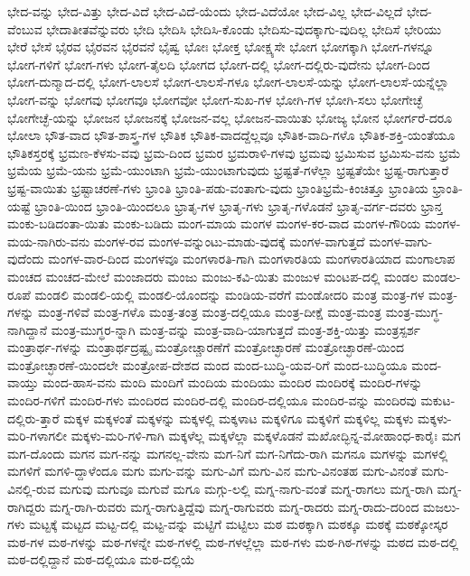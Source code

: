{ಭೇದ-ವನ್ನು
ಭೇದ-ವಿತ್ತು
ಭೇದ-ವಿದೆ
ಭೇದ-ವಿದೆ-ಯೆಂದು
ಭೇದ-ವಿದೆಯೋ
ಭೇದ-ವಿಲ್ಲ
ಭೇದ-ವಿಲ್ಲದೆ
ಭೇದ-ವೆಂಬುವ
ಭೇದಾತೀತವೆನ್ನುವರು
ಭೇದಿ
ಭೇದಿಸಿ
ಭೇದಿಸಿ-ಕೊಂಡು
ಭೇದಿಸು-ವುದಕ್ಕಾಗು-ವುದಿಲ್ಲ
ಭೇದಿಸೆ
ಭೇರಿಯು
ಭೇರೆ
ಭೇಸೆ
ಭೈರವ
ಭೈರವನ
ಭೈರವನೆ
ಭೈಷ್ವ
ಭೋಃ
ಭೋಕ್ತ
ಭೋಕ್ಷ್ಯಸೇ
ಭೋಗ
ಭೋಗಕ್ಕಾಗಿ
ಭೋಗ-ಗಳನ್ನೂ
ಭೋಗ-ಗಳಿಗೆ
ಭೋಗ-ಗಳು
ಭೋಗ-ತೈಲದಿ
ಭೋಗದ
ಭೋಗ-ದಲ್ಲಿ
ಭೋಗ-ದಲ್ಲಿರು-ವುದೇನು
ಭೋಗ-ದಿಂದ
ಭೋಗ-ದುನ್ಮಾದ-ದಲ್ಲಿ
ಭೋಗ-ಲಾಲಸೆ
ಭೋಗ-ಲಾಲಸೆ-ಗಳೂ
ಭೋಗ-ಲಾಲಸೆ-ಯನ್ನು
ಭೋಗ-ಲಾಲಸೆ-ಯನ್ನೆಲ್ಲಾ
ಭೋಗ-ವನ್ನು
ಭೋಗವು
ಭೋಗವೂ
ಭೋಗವೋ
ಭೋಗ-ಸುಖ-ಗಳ
ಭೋಗಿ-ಗಳ
ಭೋಗಿ-ಸಲು
ಭೋಗೇಚ್ಛೆ
ಭೋಗೇಚ್ಛೆ-ಯನ್ನು
ಭೋಜನ
ಭೋಜನಕ್ಕೆ
ಭೋಜನ-ವಲ್ಲ
ಭೋಜನ-ವಾಯಿತು
ಭೋಜ್ಯ
ಭೋನ
ಭೋರ್ಗರೆ-ದರೂ
ಭೋಲಾ
ಭೌತ-ವಾದ
ಭೌತ-ಶಾಸ್ತ್ರ-ಗಳ
ಭೌತಿಕ
ಭೌತಿಕ-ವಾದದ್ದೆಲ್ಲವೂ
ಭೌತಿಕ-ವಾದಿ-ಗಳೊ
ಭೌತಿಕ-ಶಕ್ತಿ-ಯಂತೆಯೂ
ಭೌತಿಕಸ್ತರಕ್ಕೆ
ಭ್ರಮಣ-ಕೆಳಸು-ವವು
ಭ್ರಮ-ದಿಂದ
ಭ್ರಮರ
ಭ್ರಮರಾಳಿ-ಗಳವು
ಭ್ರಮವು
ಭ್ರಮಿಸುವ
ಭ್ರಮಿಸು-ವನು
ಭ್ರಮೆ
ಭ್ರಮೆಯ
ಭ್ರಮೆ-ಯನು
ಭ್ರಮೆ-ಯುಂಟಾಗಿ
ಭ್ರಮೆ-ಯುಂಟಾಗುವುದು
ಭ್ರಷ್ಟತೆ-ಗಳೆಲ್ಲಾ
ಭ್ರಷ್ಟತೆಯೇ
ಭ್ರಷ್ಟ-ರಾಗುತ್ತಾರೆ
ಭ್ರಷ್ಟ-ವಾಯಿತು
ಭ್ರಷ್ಟಾಚರಣೆ-ಗಳು
ಭ್ರಾಂತಿ
ಭ್ರಾಂತಿ-ಪಡು-ವಂತಾಗು-ವುದು
ಭ್ರಾಂತಿಭ್ರಮೆ-ಕಿಂಚಿತ್ತೂ
ಭ್ರಾಂತಿಯ
ಭ್ರಾಂತಿ-ಯಷ್ಟೆ
ಭ್ರಾಂತಿ-ಯಿಂದ
ಭ್ರಾಂತಿ-ಯಿಂದಲೂ
ಭ್ರಾತೃ-ಗಳ
ಭ್ರಾತೃ-ಗಳು
ಭ್ರಾತೃ-ಗಳೊಡನೆ
ಭ್ರಾತೃ-ವರ್ಗ-ದವರು
ಭ್ರಾನ್ತ
ಮಂಕು-ಬಡಿದಂತಾ-ಯಿತು
ಮಂಕು-ಬಡಿದು
ಮಂಗ-ಮಾಯ
ಮಂಗಳ
ಮಂಗಳ-ಕರ-ವಾದ
ಮಂಗಳ-ಗೌರಿಯ
ಮಂಗಳ-ಮಯ-ನಾಗಿರು-ವನು
ಮಂಗಳ-ರವ
ಮಂಗಳ-ವನ್ನುಂಟು-ಮಾಡು-ವುದಕ್ಕೆ
ಮಂಗಳ-ವಾಗುತ್ತದೆ
ಮಂಗಳ-ವಾಗು-ವುದೆಂದು
ಮಂಗಳ-ವಾರ-ದಿಂದ
ಮಂಗಳವೂ
ಮಂಗಳಾರತಿ-ಗಾಗಿ
ಮಂಗಳಾರತಿಯ
ಮಂಗಳಾರತಿಯಾದ
ಮಂಗಾಲಾಪ
ಮಂಚದ
ಮಂಚದ-ಮೇಲೆ
ಮಂಜಾದರು
ಮಂಜು
ಮಂಜು-ಕವಿ-ಯಿತು
ಮಂಜುಳ
ಮಂಟಪ-ದಲ್ಲಿ
ಮಂಡಲ
ಮಂಡಲ-ರೂಪೆ
ಮಂಡಲಿ
ಮಂಡಲಿ-ಯಲ್ಲಿ
ಮಂಡಲಿ-ಯೊಂದನ್ನು
ಮಂಡಿಯ-ವರೆಗೆ
ಮಂಡೋದರಿ
ಮಂತ್ರ
ಮಂತ್ರ-ಗಳ
ಮಂತ್ರ-ಗಳನ್ನು
ಮಂತ್ರ-ಗಳಿವೆ
ಮಂತ್ರ-ಗಳೊ
ಮಂತ್ರ-ತಂತ್ರ
ಮಂತ್ರ-ದಲ್ಲಿಯೂ
ಮಂತ್ರ-ದೀಕ್ಷೆ
ಮಂತ್ರ-ಮಂತ್ರ
ಮಂತ್ರ-ಮುಗ್ಧ-ನಾಗಿದ್ದಾನೆ
ಮಂತ್ರ-ಮುಗ್ಧರ-ನ್ನಾಗಿ
ಮಂತ್ರ-ವನ್ನು
ಮಂತ್ರ-ವಾದಿ-ಯಾಗುತ್ತದೆ
ಮಂತ್ರ-ಶಕ್ತಿ-ಯಿತ್ತು
ಮಂತ್ರಸ್ಪರ್ಶ
ಮಂತ್ರಾರ್ಥ-ಗಳನ್ನು
ಮಂತ್ರಾರ್ಥದ್ರಷ್ಟೃ
ಮಂತ್ರೋಚ್ಚಾರಣೆಗೆ
ಮಂತ್ರೋಚ್ಛಾರಣೆ
ಮಂತ್ರೋಚ್ಛಾರಣೆ-ಯಿಂದ
ಮಂತ್ರೋಚ್ಛಾರಣೆ-ಯಿಂದಲೇ
ಮಂತ್ರೋಪ-ದೇಶದ
ಮಂದ
ಮಂದ-ಬುದ್ಧಿ-ಯವ-ರಿಗೆ
ಮಂದ-ಬುದ್ಧಿಯೂ
ಮಂದ-ವಾಯ್ತು
ಮಂದ-ಹಾಸ-ವನು
ಮಂದಿ
ಮಂದಿಗೆ
ಮಂದಿಯ
ಮಂದಿಯು
ಮಂದಿರ
ಮಂದಿರಕ್ಕೆ
ಮಂದಿರ-ಗಳನ್ನು
ಮಂದಿರ-ಗಳಿಗೆ
ಮಂದಿರ-ಗಳು
ಮಂದಿರದ
ಮಂದಿರ-ದಲ್ಲಿ
ಮಂದಿರ-ದಲ್ಲಿಯೂ
ಮಂದಿರ-ವನ್ನು
ಮಂದಿರವು
ಮಕುಟ-ದಲ್ಲಿರು-ತ್ತಾರೆ
ಮಕ್ಕಳ
ಮಕ್ಕಳಂತೆ
ಮಕ್ಕಳನ್ನು
ಮಕ್ಕಳಲ್ಲಿ
ಮಕ್ಕಳಾಟ
ಮಕ್ಕಳಿಗೂ
ಮಕ್ಕಳಿಗೆ
ಮಕ್ಕಳಿಲ್ಲ
ಮಕ್ಕಳು
ಮಕ್ಕಳು-ಮರಿ-ಗಳಾಗಲೀ
ಮಕ್ಕಳು-ಮರಿ-ಗಳಿ-ಗಾಗಿ
ಮಕ್ಕಳೆಲ್ಲ
ಮಕ್ಕಳೆಲ್ಲಾ
ಮಕ್ಕಳೊಡನೆ
ಮಖೋದ್ಭಿನ್ನ-ಮೋಹಾಂಧ-ಕಾರೈಃ
ಮಗ
ಮಗ-ದೊಂದು
ಮಗನ
ಮಗ-ನನ್ನು
ಮಗನಲ್ಲ-ವೇನು
ಮಗ-ನಿಗೆ
ಮಗ-ನಿಗೆದು-ರಾಗಿ
ಮಗನೂ
ಮಗಳನ್ನು
ಮಗಳಲ್ಲಿ
ಮಗಳಿಗೆ
ಮಗಳಿ-ದ್ದಾಳೆಂದೂ
ಮಗು
ಮಗು-ವನ್ನು
ಮಗು-ವಿಗೆ
ಮಗು-ವಿನ
ಮಗು-ವಿನಂತಹ
ಮಗು-ವಿನಂತೆ
ಮಗು-ವಿನಲ್ಲಿ-ರುವ
ಮಗುವು
ಮಗುವೂ
ಮಗುವೆ
ಮಗೂ
ಮಗ್ಗು-ಲಲ್ಲಿ
ಮಗ್ನ-ನಾಗು-ವಂತೆ
ಮಗ್ನ-ರಾಗಲು
ಮಗ್ನ-ರಾಗಿ
ಮಗ್ನ-ರಾಗಿದ್ದರು
ಮಗ್ನ-ರಾಗಿ-ರುವರು
ಮಗ್ನ-ರಾಗುತ್ತಿದ್ದೆವು
ಮಗ್ನ-ರಾಗುವರು
ಮಗ್ನ-ರಾದರು
ಮಗ್ನ-ರಾದು-ದರಿಂದ
ಮಜಲು-ಗಳು
ಮಟ್ಟಕ್ಕೆ
ಮಟ್ಟದ
ಮಟ್ಟ-ದಲ್ಲಿ
ಮಟ್ಟ-ವನ್ನು
ಮಟ್ಟಿಗೆ
ಮಟ್ಟಿಲು
ಮಠ
ಮಠಕ್ಕಾಗಿ
ಮಠಕ್ಕೂ
ಮಠಕ್ಕೆ
ಮಠಕ್ಕೋಸ್ಕರ
ಮಠ-ಗಳ
ಮಠ-ಗಳನ್ನು
ಮಠ-ಗಳನ್ನೇ
ಮಠ-ಗಳಲ್ಲಿ
ಮಠ-ಗಳಲ್ಲೆಲ್ಲಾ
ಮಠ-ಗಳು
ಮಠ-ಗಿಠ-ಗಳನ್ನು
ಮಠದ
ಮಠ-ದಲ್ಲಿ
ಮಠ-ದಲ್ಲಿದ್ದಾನೆ
ಮಠ-ದಲ್ಲಿಯೂ
ಮಠ-ದಲ್ಲಿಯೆ
}
